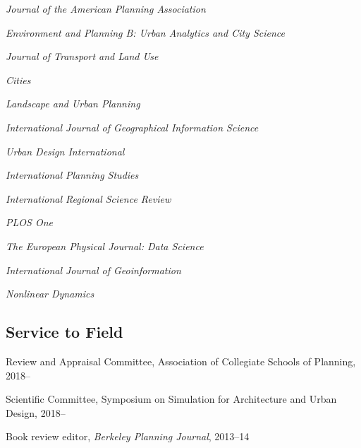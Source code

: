 \documentclass[12pt,letterpaper]{report}
\newcommand{\listitemspace}{0.15em}
\renewenvironment{itemize}
{\begin{list}{}{\setlength{\leftmargin}{0em}
			\setlength{\parskip}{0em}
			\setlength{\itemsep}{\listitemspace}
			\setlength{\parsep}{\listitemspace}}}
	{\end{list}}
\begin{document}
	\begin{itemize}
		
		\item \textit{Journal of the American Planning Association}
		
		\item \textit{Environment and Planning B: Urban Analytics and City Science}
		
		\item \textit{Journal of Transport and Land Use}
		
		\item \textit{Cities}
		
		\item \textit{Landscape and Urban Planning}
		
		\item \textit{International Journal of Geographical Information Science}
		
		\item \textit{Urban Design International}
		
		\item \textit{International Planning Studies}
		
		\item \textit{International Regional Science Review}
		
		\item \textit{PLOS One}
		
		\item \textit{The European Physical Journal: Data Science}
		
		\item \textit{International Journal of Geoinformation}
		
		\item \textit{Nonlinear Dynamics}
		
	\end{itemize}
	
	\subsection*{Service to Field}
	
	\begin{itemize}
		
		\item Review and Appraisal Committee, Association of Collegiate Schools of Planning, 2018--
		
		\item Scientific Committee, Symposium on Simulation for Architecture and Urban Design, 2018--
		
		\item Book review editor, \textit{Berkeley Planning Journal}, 2013--14
		
	\end{itemize}
	
\end{document}
